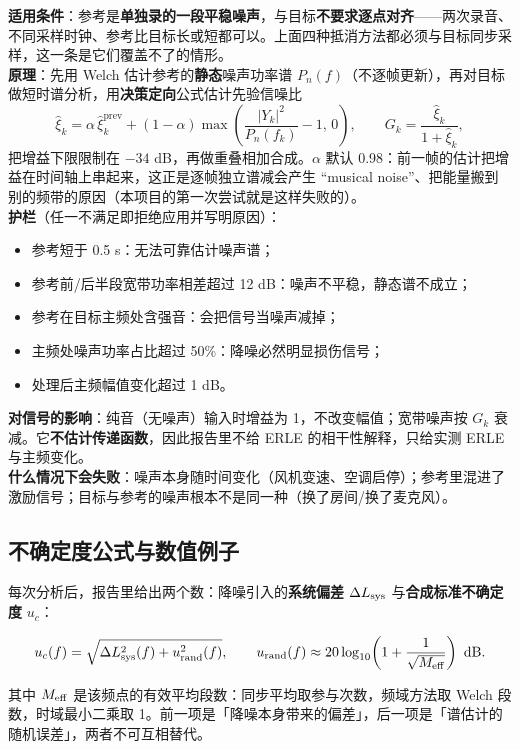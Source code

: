 \documentclass[UTF8,a4paper,12pt,scheme=chinese]{ctexart}
\begin{document}
\textbf{适用条件}：参考是\textbf{单独录的一段平稳噪声}，与目标\textbf{不要求逐点对齐}——两次录音、不同采样时钟、参考比目标长或短都可以。上面四种抵消方法都必须与目标同步采样，这一条是它们覆盖不了的情形。\\
\textbf{原理}：先用 Welch 估计参考的\textbf{静态}噪声功率谱 $P_n(f)$（不逐帧更新），再对目标做短时谱分析，用\textbf{决策定向}公式估计先验信噪比
\[
\hat\xi_k=\alpha\,\hat\xi_k^{\text{prev}}+(1-\alpha)\max\!\left(\frac{|Y_k|^2}{P_n(f_k)}-1,\,0\right),
\qquad
G_k=\frac{\hat\xi_k}{1+\hat\xi_k},
\]
把增益下限限制在 $-34$ dB，再做重叠相加合成。$\alpha$ 默认 0.98：前一帧的估计把增益在时间轴上串起来，这正是逐帧独立谱减会产生 ``musical noise''、把能量搬到别的频带的原因（本项目的第一次尝试就是这样失败的）。\\
\textbf{护栏}（任一不满足即拒绝应用并写明原因）：
\begin{itemize}[leftmargin=2em]
  \item 参考短于 0.5 s：无法可靠估计噪声谱；
  \item 参考前/后半段宽带功率相差超过 12 dB：噪声不平稳，静态谱不成立；
  \item 参考在目标主频处含强音：会把信号当噪声减掉；
  \item 主频处噪声功率占比超过 50\%：降噪必然明显损伤信号；
  \item 处理后主频幅值变化超过 1 dB。
\end{itemize}
\textbf{对信号的影响}：纯音（无噪声）输入时增益为 1，不改变幅值；宽带噪声按 $G_k$ 衰减。它\textbf{不估计传递函数}，因此报告里不给 ERLE 的相干性解释，只给实测 ERLE 与主频变化。\\
\textbf{什么情况下会失败}：噪声本身随时间变化（风机变速、空调启停）；参考里混进了激励信号；目标与参考的噪声根本不是同一种（换了房间/换了麦克风）。

\subsection{不确定度公式与数值例子}

每次分析后，报告里给出两个数：降噪引入的\textbf{系统偏差} $\Delta L_{\rm sys}$ 与\textbf{合成标准不确定度} $u_c$：

\[
u_c(f)=\sqrt{\Delta L_{\rm sys}^{2}(f)+u_{\rm rand}^{2}(f)},
\qquad
u_{\rm rand}(f)\approx 20\log_{10}\!\left(1+\frac{1}{\sqrt{M_{\rm eff}}}\right)\ {\rm dB}.
\]

其中 $M_{\rm eff}$ 是该频点的有效平均段数：同步平均取参与次数，频域方法取 Welch 段数，时域最小二乘取 1。前一项是「降噪本身带来的偏差」，后一项是「谱估计的随机误差」，两者不可互相替代。
\end{document}

